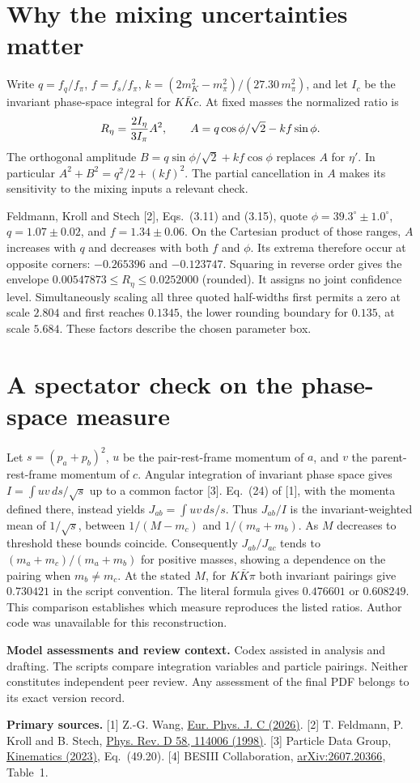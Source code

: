 \documentclass[11pt,a4paper]{article}
\begin{document}
\newpage
\section*{Why the mixing uncertainties matter}
Write $q=f_q/f_\pi$, $f=f_s/f_\pi$, $k=(2m_K^2-m_\pi^2)/(27.30\,m_\pi^2)$, and let $I_c$ be the invariant phase-space integral for $K\bar Kc$. At fixed masses the normalized ratio is
\[
R_\eta={2 I_\eta\over3 I_\pi} A^2,\qquad
A=q\cos\phi/\sqrt{2}-kf\sin\phi .
\]
The orthogonal amplitude $B=q\sin\phi/\sqrt2+kf\cos\phi$ replaces $A$ for $\eta'$. In particular $A^2+B^2=q^2/2+(kf)^2$. The partial cancellation in $A$ makes its sensitivity to the mixing inputs a relevant check.

Feldmann, Kroll and Stech [2], Eqs.~(3.11) and (3.15), quote $\phi=39.3^\circ\pm1.0^\circ$, $q=1.07\pm0.02$, and $f=1.34\pm0.06$. On the Cartesian product of those ranges, $A$ increases with $q$ and decreases with both $f$ and $\phi$. Its extrema therefore occur at opposite corners: $-0.265396$ and $-0.123747$. Squaring in reverse order gives the envelope $0.00547873\leq R_\eta\leq0.0252000$ (rounded). It assigns no joint confidence level. Simultaneously scaling all three quoted half-widths first permits a zero at scale $2.804$ and first reaches $0.1345$, the lower rounding boundary for $0.135$, at scale $5.684$. These factors describe the chosen parameter box.

\section*{A spectator check on the phase-space measure}
Let $s=(p_a+p_b)^2$, $u$ be the pair-rest-frame momentum of $a$, and $v$ the parent-rest-frame momentum of $c$. Angular integration of invariant phase space gives $I=\int uv\,ds/\sqrt{s}$ up to a common factor [3]. Eq.~(24) of [1], with the momenta defined there, instead yields $J_{ab}=\int uv\,ds/s$. Thus $J_{ab}/I$ is the invariant-weighted mean of $1/\sqrt{s}$, between $1/(M-m_c)$ and $1/(m_a+m_b)$. As $M$ decreases to threshold these bounds coincide. Consequently $J_{ab}/J_{ac}$ tends to $(m_a+m_c)/(m_a+m_b)$ for positive masses, showing a dependence on the pairing when $m_b\ne m_c$. At the stated $M$, for $K\bar K\pi$ both invariant pairings give $0.730421$ in the script convention. The literal formula gives $0.476601$ or $0.608249$. This comparison establishes which measure reproduces the listed ratios. Author code was unavailable for this reconstruction.

\small
\textbf{Model assessments and review context.} Codex assisted in analysis and drafting. The scripts compare integration variables and particle pairings. Neither constitutes independent peer review. Any assessment of the final PDF belongs to its exact version record.

\textbf{Primary sources.}
[1] Z.-G. Wang, \href{https://doi.org/10.1140/epjc/s10052-026-16450-0}{Eur. Phys. J. C (2026)}.
[2] T. Feldmann, P. Kroll and B. Stech, \href{https://doi.org/10.1103/PhysRevD.58.114006}{Phys. Rev. D 58, 114006 (1998)}.
[3] Particle Data Group, \href{https://pdg.lbl.gov/2023/reviews/rpp2023-rev-kinematics.pdf}{Kinematics (2023)}, Eq.~(49.20).
[4] BESIII Collaboration, \href{https://arxiv.org/abs/2607.20366}{arXiv:2607.20366}, Table~1.
\end{document}
